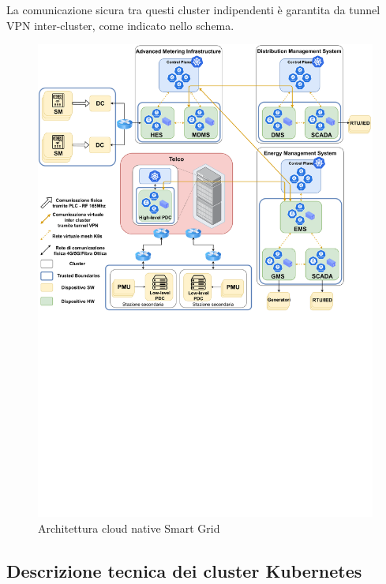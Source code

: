 La comunicazione sicura tra questi cluster indipendenti è garantita da tunnel VPN inter-cluster, come indicato nello schema.

\begin{figure}[!h]
    \centering
    \includegraphics[trim= 0cm 36cm 0cm 0cm, clip, width=1\linewidth]{img/Cloud-native-Smart-Grid-v6.drawio.pdf}
    \caption{Architettura cloud native Smart Grid}
    \label{fig:arch-sm-cloud}
\end{figure}

\newpage
\subsection{Descrizione tecnica dei cluster Kubernetes}


